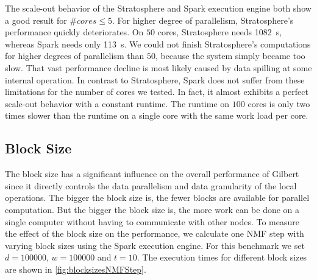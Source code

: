 The scale-out behavior of the Stratosphere and Spark execution engine both show a good result for $\#cores \le 5$.
For higher degree of parallelism, Stratosphere's performance quickly deteriorates.
On $50$ cores, Stratosphere needs \SI{1082}{\second}, whereas Spark needs only \SI{113}{\second}.
We could not finish Stratosphere's computations for higher degrees of parallelism than $50$, because the system simply became too slow.
That vast performance decline is most likely caused by data spilling at some internal operation.
In contrast to Stratosphere, Spark does not suffer from these limitations for the number of cores we tested.
In fact, it almost exhibits a perfect scale-out behavior with a constant runtime.
The runtime on $100$ cores is only two times slower than the runtime on a single core with the same work load per core.

\subsection{Block Size}

The block size has a significant influence on the overall performance of Gilbert since it directly controls the data parallelism and data granularity of the local operations.
The bigger the block size is, the fewer blocks are available for parallel computation.
But the bigger the block size is, the more work can be done on a single computer without having to communicate with other nodes.
To measure the effect of the block size on the performance, we calculate one NMF step with varying block sizes using the Spark execution engine.
For this benchmark we set $d=100000$, $w = 100000$ and $t = 10$.
The execution times for different block sizes are shown in \cref{fig:blocksizesNMFStep}.

